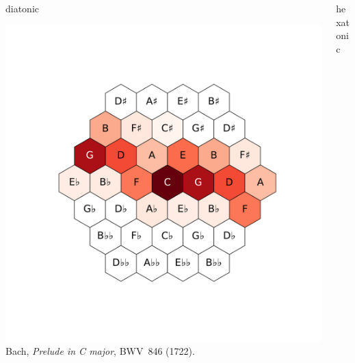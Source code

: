 \begin{frame}{\insertsectionhead}

  \begin{columns}
    \begin{column}{.33\linewidth}
      \centering
      \alert{diatonic}

      \vspace{1em}

      \includegraphics[trim=0 100 0 100, clip, width=\linewidth]{img/bach.pdf}
      Bach, \emph{Prelude in C major}, BWV~846 (1722).
    \end{column}
    \pause
    \begin{column}{.33\linewidth}
      \centering
      \alert{hexatonic}

      \vspace{1em}


\end{column}
\end{columns}
\end{frame}
